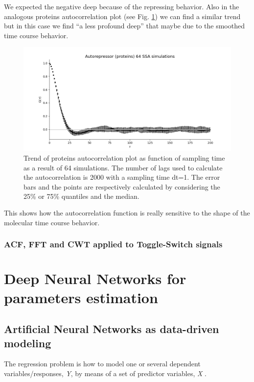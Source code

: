 \documentclass[12pt,a4paper]{report}
\begin{document}
We expected the negative deep because of the repressing behavior. Also in the analogous proteins autocorrelation plot (see Fig. \ref{AutorepressorProteinsACFnlags2000dt1nsimulations64}) we can find a similar trend but in this case we find ``a less profound deep'' that maybe due to the smoothed time course behavior.
\newpage
\begin{figure}[!ht]
\centering
\includegraphics[scale=0.60]{AutorepressorProteinsACFnlags2000dt1nsimulations64.PNG}
\caption{Trend of proteins autocorrelation plot as function of sampling time as a result of 64 simulations. The number of lags used to calculate the autocorrelation is 2000 with a sampling time dt=1. The error bars  and the points are respectively calculated by considering the 25\% or 75\% quantiles and the median.}
\label{AutorepressorProteinsACFnlags2000dt1nsimulations64}
\end{figure}

This shows how the autocorrelation function is really sensitive to the shape of the molecular time course behavior.  

\newpage




\section{ACF, FFT and CWT applied to Toggle-Switch signals}

\part{Deep Neural Networks for parameters estimation}
\chapter{Artificial Neural Networks as data-driven modeling}
The regression problem is how to model one or several dependent variables/responses, \emph{Y}, by means of a set of predictor variables, \emph{X} \cite{datadrivenmodeling}. 
\end{document}
